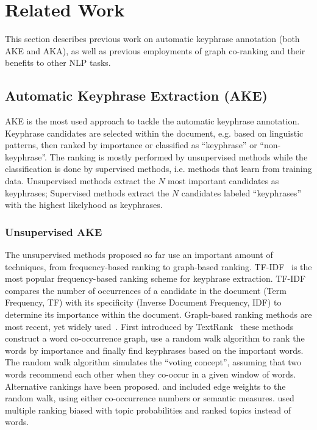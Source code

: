 \section{Related Work}
\label{sec:related_work}
  This section describes previous work on automatic keyphrase annotation (both
  AKE and AKA), as well as previous employments of graph co-ranking and their
  benefits to other NLP tasks.

  \subsection{Automatic Keyphrase Extraction (AKE)}
  \label{subsec:ake}
    AKE is the most used approach to tackle the automatic keyphrase annotation.
    Keyphrase candidates are selected within the document, e.g. based on
    linguistic patterns, then ranked by importance or classified as
    ``keyphrase'' or ``non-keyphrase''. The ranking is
    mostly performed by unsupervised methods while the classification is done by
    supervised methods, i.e. methods that learn from training data. Unsupervised
    methods extract the $N$ most important candidates as keyphrases; Supervised
    methods extract the $N$ candidates labeled ``keyphrases'' with the highest
    likelyhood as keyphrases.

    \subsubsection{Unsupervised AKE}
    \label{subsubsec:unsupervised_ake}
      The unsupervised methods proposed so far use an important amount of
      techniques, from frequency-based ranking to graph-based ranking.
      TF-IDF~\cite{jones1972tfidf} is the most popular frequency-based ranking
      scheme for keyphrase extraction. TF-IDF compares the number of occurrences
      of a candidate in the document (Term Frequency, TF) with its specificity
      (Inverse Document Frequency, IDF) to determine its importance within the
      document. Graph-based ranking methods are most recent, yet widely
      used~\cite{mihalcea2004textrank,wan2008expandrank,tsatsaronis2010semanticrank,liu2010topicalpagerank,bougouin2013topicrank}.
      First introduced by TextRank~\cite{mihalcea2004textrank} these methods
      construct a word co-occurrence graph, use a random walk algorithm to rank
      the words by importance and finally find keyphrases based on the important
      words. The random walk algorithm simulates the ``voting concept'',
      assuming that two words recommend each other when they co-occur in a given
      window of words. Alternative rankings have been proposed.
       and 
      included edge weights to the random walk, using either co-occurrence
      numbers or semantic measures.  used
      multiple ranking biased with topic probabilities and
       ranked topics instead of words.

